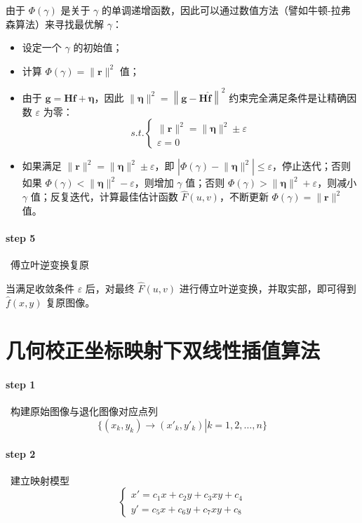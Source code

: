 \documentclass{article}
\begin{document}
由于 $\varPhi(\gamma)$ 是关于 $\gamma$ 的单调递增函数，因此可以通过数值方法（譬如牛顿-拉弗森算法）来寻找最优解 $\gamma$：

\begin{itemize}
    \item 设定一个 $\gamma$ 的初始值；
    \item 计算 $\varPhi(\gamma)=\lVert\bm{r}\rVert^2$ 值；
    \item 由于 $\bm{g}=\bm{H}\bm{f}+\bm{\eta}$，因此 $\lVert\bm{\eta}\rVert^2=\left\lVert\bm{g}-\bm{H}\widehat{\bm{f}}\right\rVert^2$ 约束完全满足条件是让精确因数 $\varepsilon$ 为零：
    \[ s.t.\begin{cases}
        \lVert\bm{r}\rVert^2=\lVert\bm{\eta}\rVert^2\pm\varepsilon
        \\[10pt]
        \varepsilon=0
    \end{cases} \]
    \item 如果满足 $\lVert\bm{r}\rVert^2=\lVert\bm{\eta}\rVert^2\pm\varepsilon$，即 $\displaystyle\left|\varPhi(\gamma)-\lVert\bm{\eta}\rVert^2\right|\leqslant\varepsilon$，停止迭代；否则如果 $\varPhi(\gamma)<\lVert\bm{\eta}\rVert^2-\varepsilon$，则增加 $\gamma$ 值；否则 $\varPhi(\gamma)>\lVert\bm{\eta}\rVert^2+\varepsilon$，则减小 $\gamma$ 值；反复迭代，计算最佳估计函数 $\widehat{F}(u,v)$，不断更新 $\varPhi(\gamma)=\lVert\bm{r}\rVert^2$ 值。
\end{itemize}

\paragraph*{step 5}~{傅立叶逆变换复原}

当满足收敛条件 $\varepsilon$ 后，对最终 $\widehat{F}(u,v)$ 进行傅立叶逆变换，并取实部，即可得到 $\widehat{f}(x,y)$ 复原图像。



\section{几何校正坐标映射下双线性插值算法}
\paragraph*{step 1}~{构建原始图像与退化图像对应点列}
\[ \{(x_k,y_k)\to(x'_k,y'_k)\left.\right|k=1,2,\ldots,n\} \]

\paragraph*{step 2}~{建立映射模型}
\[ \begin{cases}
    x'=c_1x+c_2y+c_3xy+c_4
    \\[10pt]
    y'=c_5x+c_6y+c_7xy+c_8
\end{cases} \]
\end{document}
